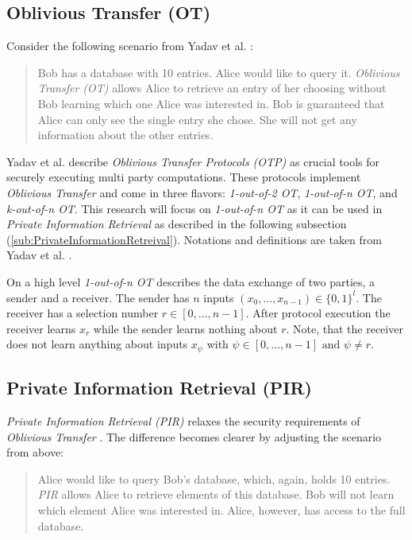 \subsection*{Oblivious Transfer (OT)} \label{sub:ObliviousTransfer}
Consider the following scenario from Yadav et al. \cite{yadav2022survey}:
\begin{quotation}
    Bob has a database with 10 entries.
    Alice would like to query it.
    \textit{Oblivious Transfer (OT)} allows Alice to retrieve an entry of her choosing without Bob learning which one Alice was interested in.
    Bob is guaranteed that Alice can only see the single entry she chose.
    She will not get any information about the other entries.
\end{quotation}

Yadav et al. \cite{yadav2022survey} describe \textit{Oblivious Transfer Protocols (OTP)} as crucial tools for securely executing multi party computations.
These protocols implement \textit{Oblivious Transfer} and come in three flavors:
\textit{1-out-of-2 OT}, \textit{1-out-of-n OT}, and \textit{k-out-of-n OT}.
This research will focus on \textit{1-out-of-n OT} as it can be used in \textit{Private Information Retrieval} as described in the following subsection (\ref{sub:PrivateInformationRetreival}).
Notations and definitions are taken from Yadav et al. \cite{yadav2022survey}.

On a high level \textit{1-out-of-n OT} describes the data exchange of two parties, a sender and a receiver.
The sender has $n$ inputs $(x_0,...,x_{n-1})\in \{0,1\}^l$.
The receiver has a selection number $r\in [0,...,n-1]$.
After protocol execution the receiver learns $x_r$ while the sender learns nothing about $r$.
Note, that the receiver does not learn anything about inputs $x_\psi$ with $\psi\in [0,...,n-1] \text{ and } \psi\neq r$.

\subsection*{Private Information Retrieval (PIR)} \label{sub:PrivateInformationRetreival}
\textit{Private Information Retrieval (PIR)} relaxes the security requirements of \textit{Oblivious Transfer} \cite{gasarch2004survey}.
The difference becomes clearer by adjusting the scenario from above:
\begin{quotation}
    Alice would like to query Bob's database, which, again, holds 10 entries.
    \textit{PIR} allows Alice to retrieve elements of this database.
    Bob will not learn which element Alice was interested in.
    Alice, however, has access to the full database.
\end{quotation}

